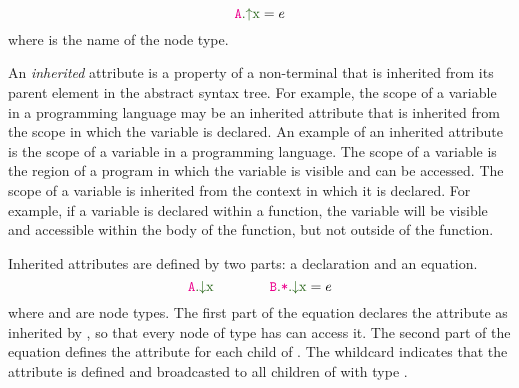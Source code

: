 \begin{equation*}
  \Asyn{A}{x} = e
  \end{equation*}
where  is the name of the node type.

An \emph{inherited} attribute is a property of a non-terminal that is inherited from
its parent element in the abstract syntax tree. For example, the scope of a variable
in a programming language may be an inherited attribute that is inherited from the
scope in which the variable is declared.
An example of an inherited attribute is the scope of a variable in a programming
language. The scope of a variable is the region of a program in which the variable
is visible and can be accessed. The scope of a variable is inherited from the
context in which it is declared. For example, if a variable is declared within a
function, the variable will be visible and accessible within the body of the function,
but not outside of the function.


Inherited attributes are defined by two parts: a declaration and an equation.
\begin{equation*}
\Ainh{A}{x} \quad\quad \quad\quad \Ainhdef{B}{*}{x} = e
\end{equation*}
where  and  are node types.
The first part of the equation declares the attribute  as inherited by ,
so that every node of type  has can access it. The second part of the
equation defines the attribute for each child of . The whildcard \astnode{*}
indicates that the attribute is defined and broadcasted to all children of  with type .

